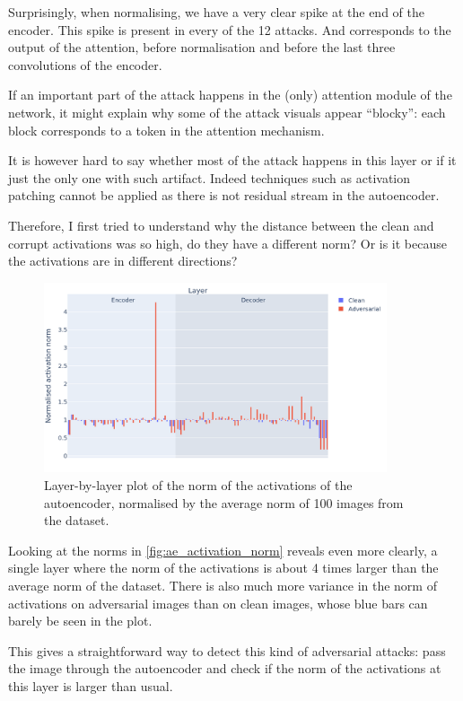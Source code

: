 \documentclass[]{scrarticle}
\begin{document}
Surprisingly, when normalising, we have a very clear spike at the end of the encoder.
This spike is present in every of the 12 attacks.
And corresponds to the output of the attention, before normalisation
and before the last three convolutions of the encoder.

If an important part of the attack
happens in the (only) attention module of the network,
it might explain why some of the attack visuals
appear ``blocky'': each block corresponds to a token
in the attention mechanism.

It is however hard to say whether most of the attack happens
in this layer or if it just the only one with such artifact.
Indeed techniques such as activation patching \cite{Zhang2023TowardsBP}
cannot be applied as there is not residual stream in the autoencoder.

Therefore, I first tried to understand why the distance between the clean
and corrupt activations was so high, do they have a different norm?
Or is it because the activations are in different directions?

\begin{figure}[h]
  \centering
  \includegraphics[width=0.9\textwidth]{../images/ae_activation_norm.png}
  \caption{
    Layer-by-layer plot of the norm of the activations of the autoencoder,
    normalised by the average norm of 100 images from the dataset.
  }
  \label{fig:ae_activation_norm}
\end{figure}

Looking at the norms in \autoref{fig:ae_activation_norm} reveals
even more clearly, a single layer where the norm of the activations is about
4 times larger than the average norm of the dataset.
There is also much more variance in the norm of activations
on adversarial images than on clean images, whose blue
bars can barely be seen in the plot.

This gives a straightforward way to detect this kind of adversarial
attacks: pass the image through the autoencoder and check if the
norm of the activations at this layer is larger than usual.
\end{document}
